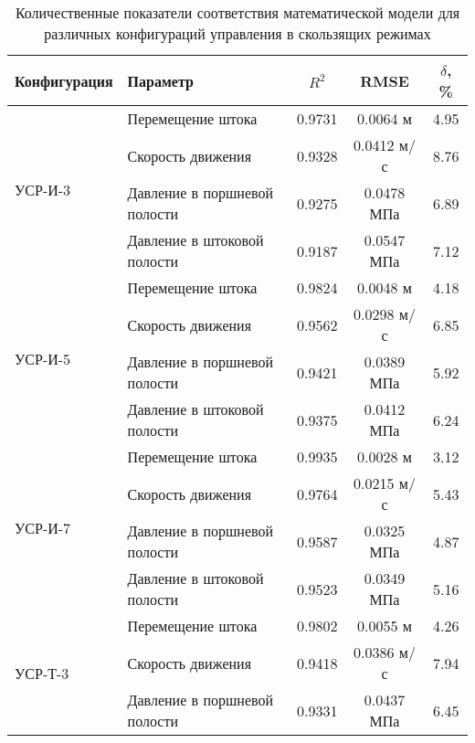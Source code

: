 \begin{table}[ht]
	\centering
	\caption{Количественные показатели соответствия математической модели для различных конфигураций управления в скользящих режимах}
	\small
	\label{tab:smc_validation}
	\begin{tabular}{llccc}
		\hline
		\textbf{Конфигурация}    & \textbf{Параметр}            & $R^2$        & RMSE             & $\delta$, \% \\
		\hline
		\multirow{4}{*}{УСР-И-3} & Перемещение штока            & \num{0.9731} & \num{0.0064} м   & \num{4.95}   \\
		                         & Скорость движения            & \num{0.9328} & \num{0.0412} м/с & \num{8.76}   \\
		                         & Давление в поршневой полости & \num{0.9275} & \num{0.0478} МПа & \num{6.89}   \\
		                         & Давление в штоковой полости  & \num{0.9187} & \num{0.0547} МПа & \num{7.12}   \\
		\hline
		\multirow{4}{*}{УСР-И-5} & Перемещение штока            & \num{0.9824} & \num{0.0048} м   & \num{4.18}   \\
		                         & Скорость движения            & \num{0.9562} & \num{0.0298} м/с & \num{6.85}   \\
		                         & Давление в поршневой полости & \num{0.9421} & \num{0.0389} МПа & \num{5.92}   \\
		                         & Давление в штоковой полости  & \num{0.9375} & \num{0.0412} МПа & \num{6.24}   \\
		\hline
		\multirow{4}{*}{УСР-И-7} & Перемещение штока            & \num{0.9935} & \num{0.0028} м   & \num{3.12}   \\
		                         & Скорость движения            & \num{0.9764} & \num{0.0215} м/с & \num{5.43}   \\
		                         & Давление в поршневой полости & \num{0.9587} & \num{0.0325} МПа & \num{4.87}   \\
		                         & Давление в штоковой полости  & \num{0.9523} & \num{0.0349} МПа & \num{5.16}   \\
		\hline
		\multirow{4}{*}{УСР-Т-3} & Перемещение штока            & \num{0.9802} & \num{0.0055} м   & \num{4.26}   \\
		                         & Скорость движения            & \num{0.9418} & \num{0.0386} м/с & \num{7.94}   \\
		                         & Давление в поршневой полости & \num{0.9331} & \num{0.0437} МПа & \num{6.45}   \\

\end{tabular}
\end{table}
